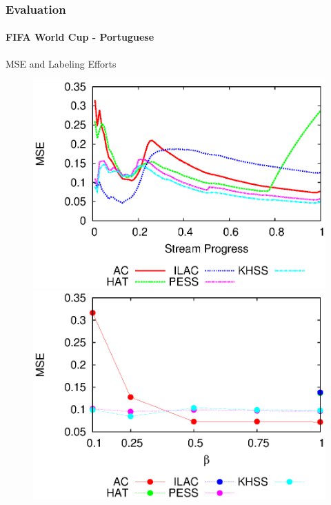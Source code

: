 \documentclass[14pt]{beamer}
\begin{document}
\begin{frame}
\frametitle{Evaluation}
\framesubtitle{FIFA World Cup - Portuguese}
MSE and Labeling Efforts
\begin{figure}[htp!]
\label{fig:fm_1}
\centering
\includegraphics[scale=0.41]{pt_mse.eps}
\includegraphics[scale=0.41]{pt_le_mse.eps}
\end{figure}
\end{frame}
\end{document}

